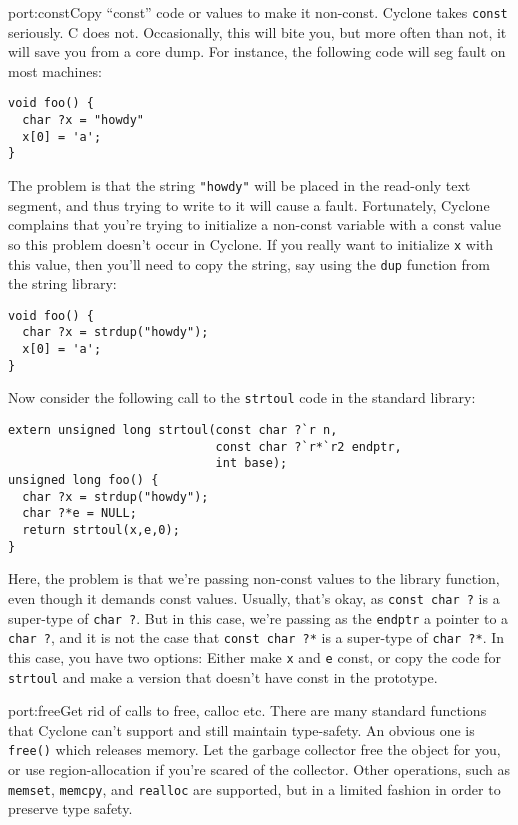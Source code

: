 \begin{porta}{port:const}{Copy ``const'' code or values to make it non-const.}
Cyclone takes \texttt{const} seriously.  C does not.  Occasionally,
this will bite you, but more often than not, it will save you from
a core dump.  For instance, the following code will seg fault on
most machines:
\begin{verbatim}
void foo() {
  char ?x = "howdy"
  x[0] = 'a';
}
\end{verbatim}

The problem is that the string \texttt{"howdy"} will be placed in
the read-only text segment, and thus trying to write to it will
cause a fault.  Fortunately, Cyclone complains that you're trying
to initialize a non-const variable with a const value so this
problem doesn't occur in Cyclone.  If you really want to initialize
\texttt{x} with this value, then you'll need to copy the string,
say using the \texttt{dup} function from the string library:
\begin{verbatim}
void foo() {
  char ?x = strdup("howdy");
  x[0] = 'a';
}
\end{verbatim}

Now consider the following call to the \texttt{strtoul} code in the
standard library:
\begin{verbatim}
extern unsigned long strtoul(const char ?`r n, 
                             const char ?`r*`r2 endptr,
                             int base);
unsigned long foo() {
  char ?x = strdup("howdy");
  char ?*e = NULL;
  return strtoul(x,e,0);
}
\end{verbatim}

Here, the problem is that we're passing non-const values to the
library function, even though it demands const values.  Usually,
that's okay, as \texttt{const char ?} is a super-type of
\texttt{char ?}.  But in this case, we're passing as the
\texttt{endptr} a pointer to a \texttt{char ?}, and it
is not the case that \texttt{const char ?*} is a super-type
of \texttt{char ?*}.  In this case, you have two options:
Either make \texttt{x} and \texttt{e} const, or copy the
code for \texttt{strtoul} and make a version that doesn't
have const in the prototype.  
\end{porta}

\begin{porta}{port:free}{Get rid of calls to free, calloc etc.}
There are many standard functions that Cyclone can't support 
and still maintain type-safety.  An obvious one is \texttt{free()}
which releases memory.  Let the garbage collector free the object
for you, or use region-allocation if you're scared of the collector.
Other operations, such as \texttt{memset}, \texttt{memcpy}, 
and \texttt{realloc} are supported, but in a limited fashion in 
order to preserve  type safety.  
\end{porta}


